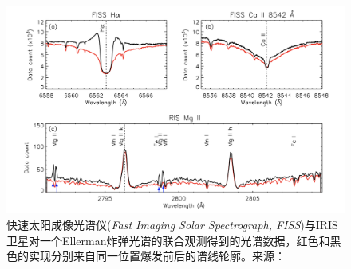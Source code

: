 \begin{figure}
	\centering
	\includegraphics[width=0.8\linewidth]{figs/fig4}
	\caption{快速太阳成像光谱仪(\textit{Fast Imaging Solar Spectrograph, FISS})与IRIS卫星对一个Ellerman炸弹光谱的联合观测得到的光谱数据，红色和黑色的实现分别来自同一位置爆发前后的谱线轮廓。来源：\textcite{Hong2017a}}
	\label{fig:4}
\end{figure}
